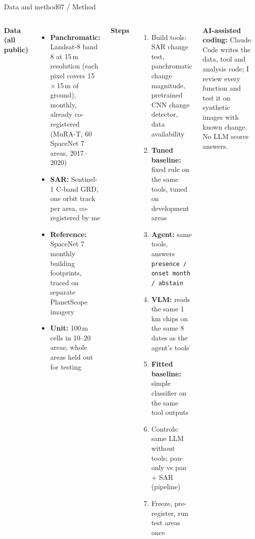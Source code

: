 \documentclass[aspectratio=169,11pt]{beamer}
\begin{document}
\begin{frame}[shrink=26]{Data and method}{07 / Method}
\begin{columns}[T,onlytextwidth]
\textbf{\small Data (all public)}
\begin{itemize}\footnotesize
  \item \textbf{Panchromatic:} Landsat-8 band 8 at 15\,m resolution (each pixel covers 15\,$\times$\,15\,m of ground), monthly, already co-registered (MuRA-T, 60 SpaceNet 7 areas, 2017--2020)
  \item \textbf{SAR:} Sentinel-1 C-band GRD, one orbit track per area, co-registered by me
  \item \textbf{Reference:} SpaceNet 7 monthly building footprints, traced on separate PlanetScope imagery
  \item \textbf{Unit:} 100\,m cells in 10--20 areas; whole areas held out for testing
\end{itemize}
\textbf{\small Steps}
\begin{enumerate}\footnotesize
  \item Build tools: SAR change test, panchromatic change magnitude, pretrained CNN change detector, data availability
  \item \textbf{Tuned baseline:} fixed rule on the same tools, tuned on development areas
  \item \textbf{Agent:} same tools, answers \texttt{presence / onset month / abstain}
  \item \textbf{VLM:} reads the same 1\,km chips on the same 8 dates as the agent's tools
  \item \textbf{Fitted baseline:} simple classifier on the same tool outputs
  \item Controls: same LLM without tools; pan-only vs pan + SAR (pipeline)
  \item Freeze, pre-register, run test areas once
\end{enumerate}
{\footnotesize\textbf{AI-assisted coding:} Claude Code writes the data, tool and analysis code; I review every function and test it on synthetic images with known change. No LLM scores answers.}
\end{columns}
\end{frame}
\end{document}
